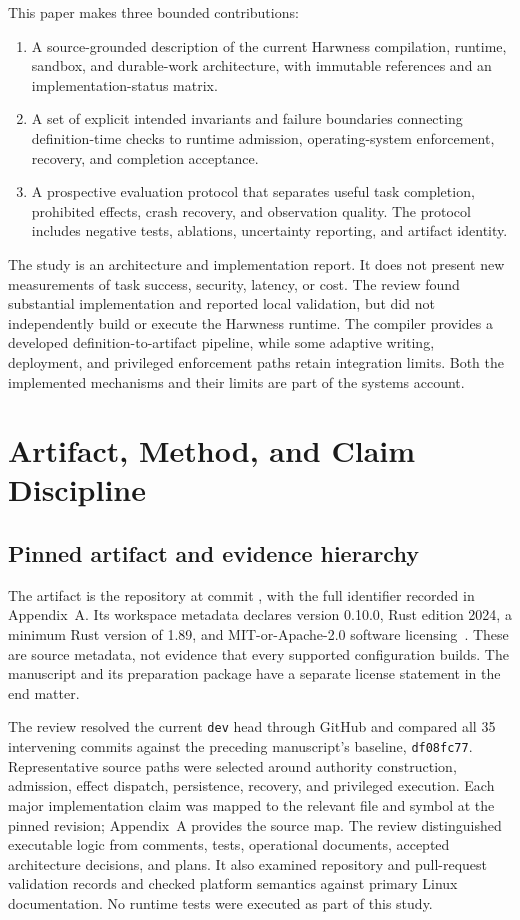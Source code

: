 This paper makes three bounded contributions:
\begin{enumerate}
  \item A source-grounded description of the current Harwness compilation, runtime, sandbox, and durable-work architecture, with immutable references and an implementation-status matrix.
  \item A set of explicit intended invariants and failure boundaries connecting definition-time checks to runtime admission, operating-system enforcement, recovery, and completion acceptance.
  \item A prospective evaluation protocol that separates useful task completion, prohibited effects, crash recovery, and observation quality. The protocol includes negative tests, ablations, uncertainty reporting, and artifact identity.
\end{enumerate}

The study is an architecture and implementation report. It does not present new measurements of task success, security, latency, or cost. The review found substantial implementation and reported local validation, but did not independently build or execute the Harwness runtime. The compiler provides a developed definition-to-artifact pipeline, while some adaptive writing, deployment, and privileged enforcement paths retain integration limits. Both the implemented mechanisms and their limits are part of the systems account.

\section{Artifact, Method, and Claim Discipline}
\label{sec:method}

\subsection{Pinned artifact and evidence hierarchy}

The artifact is the repository at commit \artifactshort{}, with the full identifier recorded in Appendix~A. Its workspace metadata declares version 0.10.0, Rust edition 2024, a minimum Rust version of 1.89, and MIT-or-Apache-2.0 software licensing~\cite{ref3}. These are source metadata, not evidence that every supported configuration builds. The manuscript and its preparation package have a separate license statement in the end matter.

The review resolved the current \texttt{dev} head through GitHub and compared all 35 intervening commits against the preceding manuscript's baseline, \texttt{df08fc77}. Representative source paths were selected around authority construction, admission, effect dispatch, persistence, recovery, and privileged execution. Each major implementation claim was mapped to the relevant file and symbol at the pinned revision; Appendix~A provides the source map. The review distinguished executable logic from comments, tests, operational documents, accepted architecture decisions, and plans. It also examined repository and pull-request validation records and checked platform semantics against primary Linux documentation. No runtime tests were executed as part of this study.

